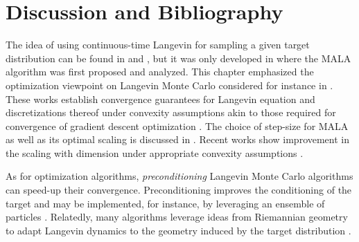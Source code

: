 \section{Discussion and Bibliography}
\label{sec:6.4}

The idea of using continuous-time Langevin for sampling a given target distribution can be
found in \cite{20} and \cite{98}, but it was only developed in \cite{203} where the MALA
algorithm was first proposed and analyzed. This chapter emphasized the optimization viewpoint
on Langevin Monte Carlo considered for instance in \cite{78,79,237,64}. These works establish
convergence guarantees for Langevin equation and discretizations thereof under convexity
assumptions akin to those required for convergence of gradient descent optimization \cite{34}.
The choice of step-size for MALA as well as its optimal scaling is discussed in \cite{198}.
Recent works show improvement in the scaling with dimension under appropriate convexity
assumptions \cite{139}.

As for optimization algorithms, \emph{preconditioning} Langevin Monte Carlo algorithms can
speed-up their convergence. Preconditioning improves the conditioning of the target and may be
implemented, for instance, by leveraging an ensemble of particles \cite{137,77,44}.
Relatedly, many algorithms leverage ideas from Riemannian geometry to adapt Langevin dynamics
to the geometry induced by the target distribution \cite{89,184,79}.


